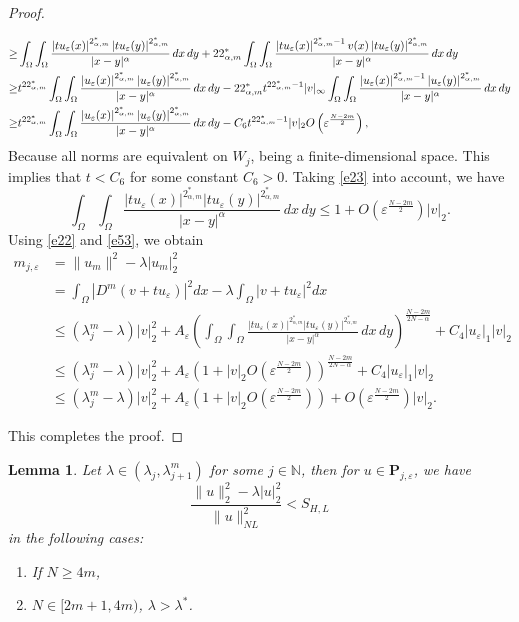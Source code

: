 \documentclass[reqno]{amsart}
\newtheorem{lemma}[theorem]{Lemma}
\newcommand{\la} {\lambda}
\newcommand{\eps}{\varepsilon}
\newcommand{\Om}{\Omega}
\newcommand{\al} {\alpha}
\newcommand{\mb} {\mathbb}
\numberwithin{theorem}{section} \numberwithin{equation}{section}
\begin{document}
\begin{proof}
\begin{enumerate}
\begin{align}
\geq & \int_{\Om} \int_{\Om} \frac{\left|t u_\eps(x)\right|^{2_{\al, m}^*}\left|t u_\eps(y)\right|^{2_{\al, m}^*}}{|x-y|^\al} \, dx \, dy+22_{\al, m}^* \int_{\Om} \int_{\Om} \frac{\left|t u_\eps(x)\right|^{2_{\al, m}^*-1} v(x)\left|t u_\eps(y)\right|^{2_{\al, m}^*}}{|x-y|^\al} \, dx \, dy \\ \notag
\geq & t^{22_{\al, m}^*} \int_{\Om} \int_{\Om} \frac{\left|u_\eps(x)\right|^{2_{\al, m}^*}\left|u_\eps(y)\right|^{2_{\al, m}^*}}{|x-y|^\al} \, dx \, dy-22_{\al, m}^* t^{22_{\al, m}^*-1}|v|_{\infty} \int_{\Om} \int_{\Om} \frac{\left|u_\eps(x)\right|^{2_{\al, m}^*-1}\left|u_\eps(y)\right|^{2_{\al, m}^*}}{|x-y|^\al} \, dx \, dy \\
\geq & t^{22_{\al, m}^*} \int_{\Om} \int_{\Om} \frac{\left|u_\eps(x)\right|^{2_{\al, m}^*}\left|u_\eps(y)\right|^{2_{\al, m}^*}}{|x-y|^\al} \, dx \, dy-C_6 t^{22_{\al, m}^*-1}|v|_2 O\left(\eps^{\frac{N-2m}{2}}\right),
\end{align}
Because all norms are equivalent on ${W}_j$, being a finite-dimensional space. This implies that $t<C_6$ for some constant $C_6>0$. Taking \eqref{e23} into account, we have
\[\int_{\Om} \int_{\Om} \frac{\left|t u_{\eps}(x)\right|^{2_{\al, m}^*}\left|t u_{\eps}(y)\right|^{2_{\al, m}^*}}{|x-y|^\al} \, dx \, dy \leq 1+O\left(\eps^{\frac{N-2m}{2}}\right)|v|_2.\]
Using \eqref{e22} and \eqref{e53}, we obtain 
\begin{align*}
m_{j, \eps}&=\|u_m\|^2 -\la|u_m|_2^2\\ 
& =\int_{\Om}|D^m(v+t u_{\eps})|^2 d x-\la \int_{\Om}|v+t u_{\eps}|^2 d x \\
& \leq\left(\la^m_j-\la\right)|v|_2^2+A_{\eps}\left(\int_{\Om} \int_{\Om} \frac{|t u_{\eps}(x)|^{2_{\al, m}^*}|t u_{\eps}(y)|^{2_{\al, m}^*}}{|x-y|^\al} \, dx \, dy\right)^{\frac{N-2m}{2N-\al}}+C_4|u_{\eps}|_1|v|_2 \\
& \leq\left(\la^m_j-\la\right)|v|_2^2+A_{\eps}\left(1+|v|_2 O\left(\eps^{\frac{N-2m}{2}}\right)\right)^{\frac{N-2m}{2N-\al}}+C_4|u_{\eps}|_1|v|_2 \\
& \leq\left(\la^m_j-\la\right)|v|_2^2+A_{\eps}\left(1+|v|_2 O\left(\eps^{\frac{N-2m}{2}}\right)\right)+O\left(\eps^{\frac{N-2m }{2}}\right)|v|_2.
\end{align*}\end{enumerate}
This completes the proof.\end{proof}
\begin{lemma} \label{l12} 
Let $\la \in\left(\la_j, \la^m_{j+1}\right)$ for some $j \in \mb{N}$, then for $u \in \mathbf{P}_{j,\eps}$, we have
\[\frac{\|u\|_2^2-\la|u|_2^2}{\|u\|_{N L}^2}<S_{H, L}\]
in the following cases:
\begin{enumerate}
\item If $N\geq4m$,
\item  $N\in[2m+1, 4m)$, $\la>\la^*$.
\end{enumerate}
\end{lemma}
\end{document}

